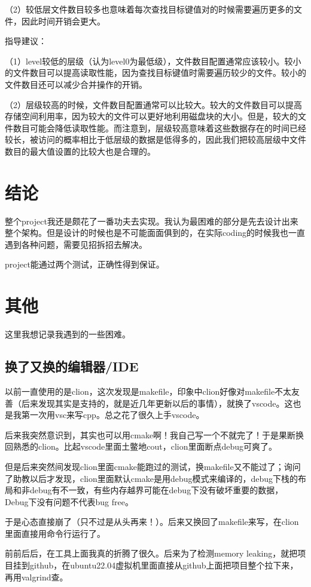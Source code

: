 \documentclass[fontset=windows]{article}
\begin{document}
（2）较低层文件数目较多也意味着每次查找目标键值对的时候需要遍历更多的文件，因此时间开销会更大。

指导建议：

（1）level较低的层级（认为level0为最低级），文件数目配置通常应该较小。较小的文件数目可以提高读取性能，因为查找目标键值时需要遍历较少的文件。较小的文件数目还可以减少合并操作的开销。

（2）层级较高的时候，文件数目配置通常可以比较大。较大的文件数目可以提高存储空间利用率，因为较大的文件可以更好地利用磁盘块的大小。但是，较大的文件数目可能会降低读取性能。而注意到，层级较高意味着这些数据存在的时间已经较长，被访问的概率相比于低层级的数据是低得多的，因此我们把较高层级中文件数目的最大值设置的比较大也是合理的。


\section{结论}
整个project我还是颇花了一番功夫去实现。我认为最困难的部分是先去设计出来整个架构。但是设计的时候也是不可能面面俱到的，在实际coding的时候我也一直遇到各种问题，需要见招拆招去解决。

project能通过两个测试，正确性得到保证。

\section{其他}

这里我想记录我遇到的一些困难。

\subsection{换了又换的编辑器/IDE}
以前一直使用的是clion，这次发现是makefile，印象中clion好像对makefile不太友善（后来发现其实是支持的，就是近几年更新以后的事情），就换了vscode。这也是我第一次用vsc来写cpp。总之花了很久上手vscode。

后来我突然意识到，其实也可以用cmake啊！我自己写一个不就完了！于是果断换回熟悉的clion。比起vscode里面土鳖地cout，clion里面断点debug可爽了。

但是后来突然间发现clion里面cmake能跑过的测试，换makefile又不能过了；询问了助教以后才发现，clion里面默认cmake是用debug模式来编译的，debug下栈的布局和非debug有不一致，有些内存越界可能在debug下没有破坏重要的数据，Debug下没有问题不代表bug free。

于是心态直接崩了（只不过是从头再来！）。后来又换回了makefile来写，在clion里面直接用命令行运行了。

前前后后，在工具上面我真的折腾了很久。后来为了检测memory leaking，就把项目挂到github，在ubuntu22.04虚拟机里面直接从github上面把项目整个拉下来，再用valgrind查。
\end{document}
